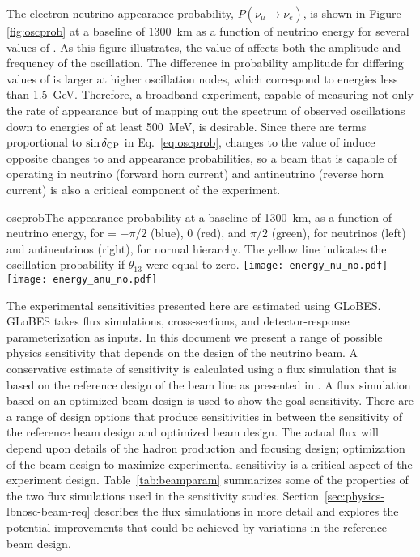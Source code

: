 The electron neutrino appearance probability, $P(\nu_\mu \rightarrow \nu_e)$, 
is shown in 
Figure \ref{fig:oscprob} 
at a baseline of 1300~km as a function of neutrino 
energy for several values of \deltacp. As this figure illustrates, the value 
of \deltacp affects both the amplitude and frequency of
the oscillation. The difference in probability amplitude
for differing values of \deltacp is larger at higher oscillation nodes, which 
correspond to energies less than 1.5~GeV. Therefore, a broadband experiment, 
capable of measuring not only the rate of \nue appearance but of mapping out the 
spectrum of observed oscillations down to energies of at least 500~MeV, 
is desirable. Since there are terms proportional to $\sin\mdeltacp$ in Eq.~\ref{eq:oscprob},
changes to the value of \deltacp induce opposite changes to \nue and
\anue appearance probabilities, so a beam that is capable of operating in
neutrino (forward horn current) and antineutrino (reverse horn current)
is also a critical component of the experiment.

\begin{cdrfigure}{oscprob}{The appearance probability at a baseline of 1300~km,
  as a function of neutrino energy, for \deltacp = $-\pi/2$ (blue), 
  0 (red), and $\pi/2$ (green), for neutrinos (left) and antineutrinos
  (right), for normal hierarchy. The yellow line indicates the oscillation
  probability if $\theta_{13}$ were equal to zero.}
\texttt{[image: energy\_nu\_no.pdf]}
\texttt{[image: energy\_anu\_no.pdf]}
\end{cdrfigure}

The experimental sensitivities presented here are estimated using 
GLoBES\cite{Huber:2004ka,Huber:2007ji}. GLoBES takes flux simulations, cross-sections,
and detector-response parameterization as inputs. In this document we present
a range of possible physics sensitivity that depends on the design of the neutrino beam.
A conservative estimate of sensitivity is calculated using a flux simulation that is based on the reference design of the beam line as presented in \vollbnf.  A flux simulation based on an optimized beam design is used to show the goal sensitivity.  There are a range of design options that produce sensitivities in between the sensitivity of the reference beam design and optimized beam design. The actual flux will depend upon details of the hadron production and focusing design; optimization of the beam design to maximize experimental sensitivity is a critical aspect of the experiment
design.  Table~\ref{tab:beamparam} summarizes some of the properties of the two flux simulations used in the sensitivity studies.  Section~\ref{sec:physics-lbnosc-beam-req} describes the flux simulations in more detail and explores the potential improvements that could be achieved by variations in the reference beam design.

